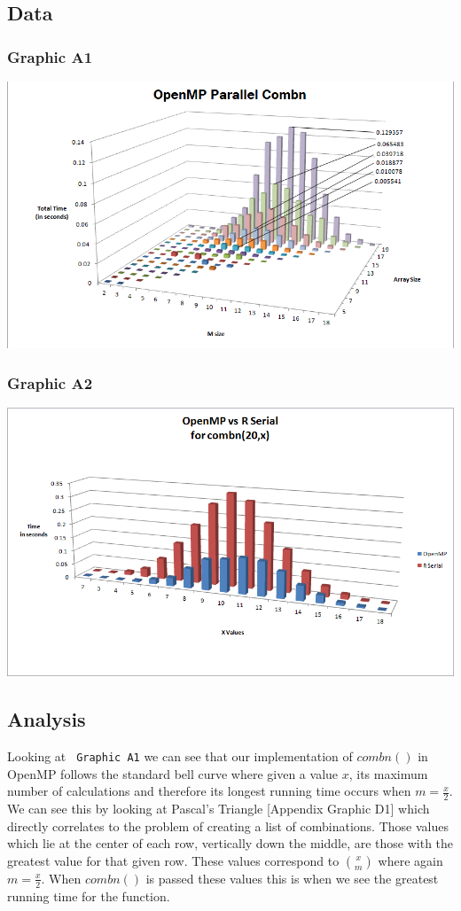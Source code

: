 \documentclass[titlepage, 11pt]{article}
\begin{document}
\subsection{Data}
\subsubsection{Graphic A1}
\includegraphics[scale = 0.5]{images/3D-OMP.png} \\
\subsubsection{Graphic A2}
\includegraphics[scale = 0.5]{images/OMPvsR.png}

\subsection{Analysis}
Looking at \verb; Graphic A1; we can see that our implementation of $combn()$ in OpenMP follows the standard bell curve where given a value $x$, its maximum number of calculations and therefore its longest running time occurs when $m = \frac{x}{2}$. We can see this by looking at Pascal's Triangle [Appendix Graphic D1] which directly correlates to the problem of creating a list of combinations. Those values which lie at the center of each row, vertically down the middle, are those with the greatest value for that given row. These values correspond to ${x \choose m}$ where again $m = \frac{x}{2}$. When $combn()$ is passed these values this is when we see the greatest running time for the function. \\
\end{document}
